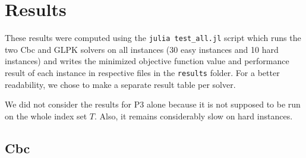 \newpage
\chapter{Results}

These results were computed using the \verb+julia test_all.jl+ script which runs the two Cbc and GLPK solvers on all instances (30 easy instances and 10 hard instances) and writes the minimized objective function value and performance result of each instance in respective files in the \verb+results+ folder. For a better readability, we chose to make a separate result table per solver.

We did not consider the results for P3 alone because it is not supposed to be run on the whole index set $T$.
Also, it remains considerably slow on hard instances.

\section{Cbc}


